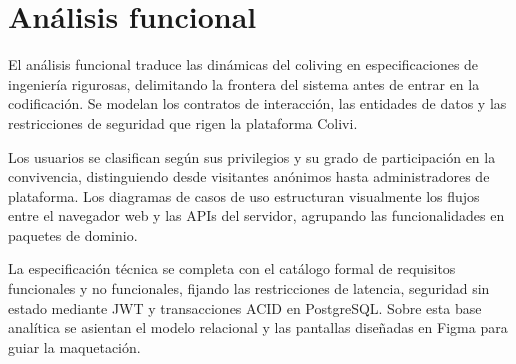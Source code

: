 \chapter{Análisis funcional}
\label{Análisis funcional}

    El análisis funcional traduce las dinámicas del coliving en especificaciones de ingeniería rigurosas, delimitando la frontera del sistema antes de entrar en la codificación. Se modelan los contratos de interacción, las entidades de datos y las restricciones de seguridad que rigen la plataforma Colivi.

    Los usuarios se clasifican según sus privilegios y su grado de participación en la convivencia, distinguiendo desde visitantes anónimos hasta administradores de plataforma. Los diagramas de casos de uso estructuran visualmente los flujos entre el navegador web y las APIs del servidor, agrupando las funcionalidades en paquetes de dominio.

    La especificación técnica se completa con el catálogo formal de requisitos funcionales y no funcionales, fijando las restricciones de latencia, seguridad sin estado mediante JWT y transacciones ACID en PostgreSQL. Sobre esta base analítica se asientan el modelo relacional y las pantallas diseñadas en Figma para guiar la maquetación.














